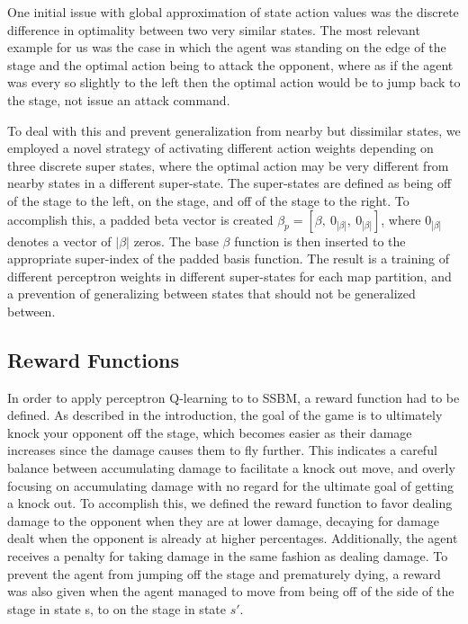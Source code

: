 One initial issue with global approximation of state action values was the discrete difference in optimality between two very similar states. The most relevant example for us was the case in which the agent was standing on the edge of the stage and the optimal action being to attack the opponent, where as if the agent was every so slightly to the left then the optimal action would be to jump back to the stage, not issue an attack command. 

To deal with this and prevent generalization from nearby but dissimilar states, we employed a novel strategy of activating different action weights depending on three discrete super states, where the optimal action may be very different from nearby states in a different super-state. The super-states are defined as being off of the stage to the left, on the stage, and off of the stage to the right. To accomplish this, a padded beta vector is created $\beta_{p} = [\beta,~0_{|\beta|},~0_{|\beta|}]$, where $0_{|\beta|}$ denotes a vector of $|\beta|$ zeros. The base $\beta$ function is then inserted to the appropriate super-index of the padded basis function. The result is a training of different perceptron weights in different super-states for each map partition, and a prevention of generalizing between states that should not be generalized between.

\subsection{Reward Functions}

In order to apply perceptron Q-learning to to SSBM, a reward function had to be defined. As described in the introduction, the goal of the game is to ultimately knock your opponent off the stage, which becomes easier as their damage increases since the damage causes them to fly further. This indicates a careful balance between accumulating damage to facilitate a knock out move, and overly focusing on accumulating damage with no regard for the ultimate goal of getting a knock out. To accomplish this, we defined the reward function to favor dealing damage to the opponent when they are at lower damage, decaying for damage dealt when the opponent is already at higher percentages. Additionally, the agent receives a penalty for taking damage in the same fashion as dealing damage. To prevent the agent from jumping off the stage and prematurely dying, a reward was also given when the agent managed to move from being off of the side of the stage in state s, to on the stage in state $s'$.

